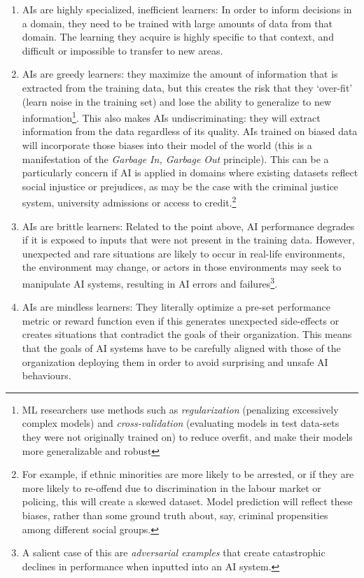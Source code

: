 \documentclass[11pt]{article}
\begin{document}
\begin{enumerate}
    \item AIs are highly specialized, inefficient learners: In order to inform decisions in a domain, they need to be trained with large amounts of data from that domain. The learning they acquire is highly specific to that context, and difficult or impossible to transfer to new areas.
    \item AIs are greedy learners: they maximize the amount of information that is extracted from the training data, but this creates the risk that they `over-fit' (learn noise in the training set) and lose the ability to generalize to new information\footnote{ML researchers use methods such as \textit{regularization} (penalizing excessively complex models) and \textit{cross-validation} (evaluating models in test data-sets they were not originally trained on) to reduce overfit, and make their models more generalizable and robust}. This also makes AIs undiscriminating: they will extract information from the data regardless of its quality. AIs trained on biased data will incorporate those biases into their model of the world (this is a manifestation of the \textit{Garbage In, Garbage Out} principle). This can be a particularly concern if AI is applied in domains where existing datasets reflect social injustice or prejudices, as may be the case with the criminal justice system, university admissions or access to credit.\footnote{For example, if ethnic minorities are more likely to be arrested, or if they are more likely to re-offend due to discrimination in the labour market or policing, this will create a skewed dataset. Model prediction will reflect these biases, rather than some ground truth about, say, criminal propensities among different social groups.}  
    \item AIs are brittle learners: Related to the point above, AI performance degrades if it is exposed to inputs that were not present in the training data. However, unexpected and rare situations are likely to occur in real-life environments, the environment may change, or actors in those environments may seek to manipulate AI systems, resulting in AI errors and failures\footnote{A salient case of this are \textit{adversarial examples} that create catastrophic declines in performance when inputted into an AI system.}.
    \item AIs are mindless learners: They literally optimize a pre-set performance metric or reward function even if this generates unexpected side-effects or creates situations that contradict the goals of their organization. This means that the goals of AI systems have to be carefully aligned with those of the organization deploying them in order to avoid surprising and unsafe AI behaviours.

\end{enumerate}
\end{document}
